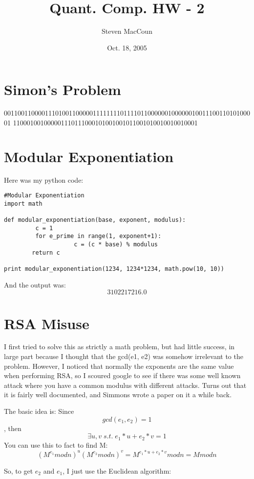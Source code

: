 \documentclass[12pt]{article}
\title{Quant. Comp. HW - 2}
\author{Steven MacCoun}
\date{Oct. 18, 2005}
\begin{document}
\maketitle						%



\section{Simon's Problem}
00110011000011101001100000111111110111101100000010000001001110011010100001
110001001000001110111000101001001011001010010010010001

\section{Modular Exponentiation}

Here was my python code:

\begin{verbatim}
#Modular Exponentiation
import math

def modular_exponentiation(base, exponent, modulus):
         c = 1
         for e_prime in range(1, exponent+1):
                    c = (c * base) % modulus
        return c

print modular_exponentiation(1234, 1234*1234, math.pow(10, 10))
\end{verbatim}
And the output was: \[\boxed{3102217216.0}\] 


\section{RSA Misuse}

I first tried to solve this as strictly a math problem, but had little success, in large part because I thought that
the gcd(e1, e2) was somehow irrelevant to the problem. However, I noticed that normally the exponents are the same value
when performing RSA, so I scoured google to see if there was some well known attack where you have a common modulus with
different attacks. Turns out that it is fairly well documented, and Simmons wrote a paper on it a while back.

The basic idea is:
Since \[gcd(e_1,e_2) = 1\],
then \[\exists u, v   \;  s.t.   \;  e_1*u + e_2*v = 1\]
You can use this to fact to find M: \[(M^{e_1} mod n)^u {(M^{e_2} mod n)}^v = M^{e_1*u + e_2*v} mod n = M mod n\]

So, to get $e_2$ and $e_1$, I just use the Euclidean algorithm:
\end{document}
